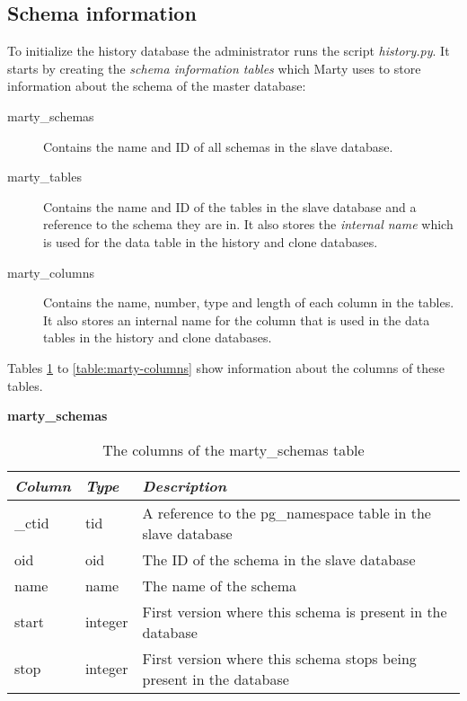 \subsection{Schema information}
To initialize the history database the administrator runs the script \textit{history.py}.
It starts by creating the \textit{schema information tables} which Marty uses to store information about the schema of the master database:

\begin{description}
  \item[marty\_schemas]
    Contains the name and ID of all schemas in the slave database.
  \item[marty\_tables]
    Contains the name and ID of the tables in the slave database and a reference to the schema they are in.
    It also stores the \textit{internal name} which is used for the data table in the history and clone databases.
  \item[marty\_columns]
    Contains the name, number, type and length of each column in the tables.
    It also stores an internal name for the column that is used in the data tables in the history and clone databases.
\end{description}

Tables \ref{table:marty-schemas} to \ref{table:marty-columns} show information about the columns of these tables.

\begin{table}[h]
  \centering
  \textbf{marty\_schemas}
  \begin{tabularx}{\textwidth}{llX}
    \textit{Column} & \textit{Type} & \textit{Description} \\
    \midrule
    \_ctid & tid & A reference to the pg\_namespace table in the slave database \\
    oid & oid & The ID of the schema in the slave database \\
    name & name & The name of the schema \\
    start & integer & First version where this schema is present in the database \\
    stop & integer & First version where this schema stops being present in the database \\
  \end{tabularx}
  \caption{The columns of the marty\_schemas table}
  \label{table:marty-schemas}
\end{table}

